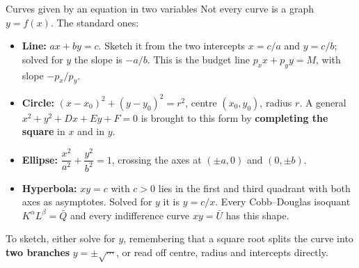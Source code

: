 \begin{rulebox}{Curves given by an equation in two variables}
Not every curve is a graph $y=f(x)$. The standard ones:
\begin{itemize}[leftmargin=1.6em,itemsep=0.3ex]
  \item \textbf{Line:} $ax+by=c$. Sketch it from the two intercepts
        $x=c/a$ and $y=c/b$; solved for $y$ the slope is $-a/b$. This is
        the budget line $p_{x}x+p_{y}y=M$, with slope $-p_{x}/p_{y}$.
  \item \textbf{Circle:} $(x-x_{0})^{2}+(y-y_{0})^{2}=r^{2}$, centre
        $(x_{0},y_{0})$, radius $r$. A general
        $x^{2}+y^{2}+Dx+Ey+F=0$ is brought to this form by
        \textbf{completing the square} in $x$ and in $y$.
  \item \textbf{Ellipse:} $\dfrac{x^{2}}{a^{2}}+\dfrac{y^{2}}{b^{2}}=1$,
        crossing the axes at $(\pm a,0)$ and $(0,\pm b)$.
  \item \textbf{Hyperbola:} $xy=c$ with $c>0$ lies in the first and third
        quadrant with both axes as asymptotes. Solved for $y$ it is
        $y=c/x$. Every Cobb--Douglas isoquant $K^{\alpha}L^{\beta}=\bar Q$
        and every indifference curve $xy=\bar U$ has this shape.
\end{itemize}
To sketch, either solve for $y$, remembering that a square root splits the
curve into \textbf{two branches} $y=\pm\sqrt{\cdots}$, or read off centre,
radius and intercepts directly.
\end{rulebox}

